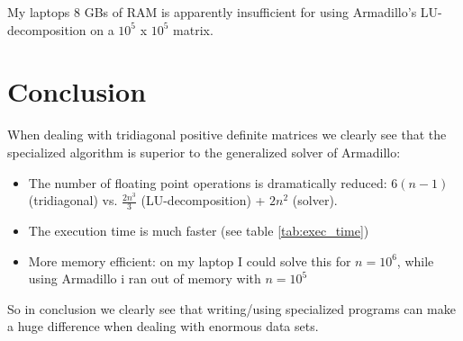 \documentclass[norsk,a4paper,12pt]{article}
\begin{document}
My laptops 8 GBs of RAM is apparently insufficient for using Armadillo's LU-decomposition on a $10^5$ x $10^5$ matrix.


\section{Conclusion}
When dealing with tridiagonal positive definite matrices we clearly see that the specialized algorithm is superior to the generalized solver of Armadillo:
\begin{itemize}
\item The number of floating point operations is dramatically reduced: $6(n-1)$ (tridiagonal) vs. $\frac{2n^3}{3}$ (LU-decomposition) + $2n^2$ (solver).
\item The execution time is much faster (see table \ref{tab:exec_time})
\item More memory efficient: on my laptop I could solve this for $n=10^6$, while using Armadillo i ran out of memory with $n=10^5$
\end{itemize}

So in conclusion we clearly see that writing/using specialized programs can make a huge difference when dealing with enormous data sets.
\end{document}
